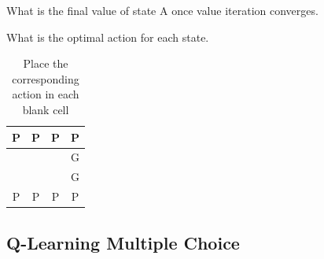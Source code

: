 \documentclass[11pt,addpoints,answers]{exam}
\begin{document}
\begin{questions}
    \question[1] What is the final value of state A once value iteration converges.
    
    \begin{your_solution}[title = Answer, height=2cm,width=3cm]
    \end{your_solution}
    
    \question[2] What is the optimal action for each state.
    \begin{table}[H]
    \begin{center}
      \begin{tabular}{ | c | c | c | c | }
        \hline
        P & P & P & P \\ \hline
         &  &  & G \\ \hline
         &  &  & G \\ \hline
        P & P & P & P \\ \hline
      \end{tabular}
      \caption{Place the corresponding action in each blank cell}
    \end{center}
    \end{table}
    
    \clearpage

\end{questions}
\subsection{Q-Learning Multiple Choice}
\end{document}

